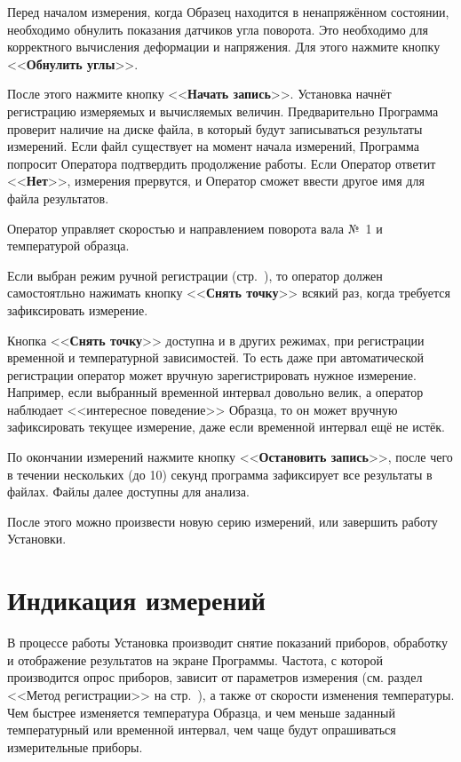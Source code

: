 \documentclass[12pt, a4paper, twocolumn]{book}
\newcommand{\CTL}[1]{<<{\bf #1}>>}
\begin{document}
Перед началом измерения, когда Образец находится в ненапряжённом состоянии, необходимо обнулить показания датчиков угла поворота. Это необходимо для корректного вычисления деформации и напряжения. Для этого нажмите кнопку \CTL{Обнулить углы}.

После этого нажмите кнопку \CTL{Начать запись}. Установка начнёт регистрацию измеряемых и вычисляемых величин. Предварительно Программа проверит наличие на диске файла, в который будут записываться результаты измерений. Если файл существует на момент начала измерений, Программа попросит Оператора подтвердить продолжение работы. Если Оператор ответит \CTL{Нет}, измерения прервутся, и Оператор сможет ввести другое имя для файла результатов.

Оператор управляет скоростью и направлением поворота вала №~1 и температурой образца.

Если выбран режим ручной регистрации (стр.~\pageref{sec_reg_type_manual}), то оператор должен самостоятльно нажимать кнопку \CTL{Снять точку}\label{sec_manual} всякий раз, когда требуется зафиксировать измерение.

Кнопка \CTL{Снять точку} доступна и в других режимах, при регистрации временной и температурной зависимостей. То есть даже при автоматической регистрации оператор может вручную зарегистрировать нужное измерение. Например, если выбранный временной интервал довольно велик, а оператор наблюдает <<интересное поведение>> Образца, то он может вручную зафиксировать текущее измерение, даже если временной интервал ещё не истёк.

По окончании измерений нажмите кнопку \CTL{Остановить запись}, после чего в течении нескольких (до 10) секунд программа зафиксирует все результаты в файлах. Файлы далее доступны для анализа.

После этого можно произвести новую серию измерений, или завершить работу Установки.

\section{Индикация измерений}

В процессе работы Установка производит снятие показаний приборов, обработку и отображение результатов на экране Программы. Частота, с которой производится опрос приборов, зависит от параметров измерения (см. раздел <<Метод регистрации>> на стр.~\pageref{sec_reg_method}), а также от скорости изменения температуры. Чем быстрее изменяется температура Образца, и чем меньше заданный температурный или временной интервал, чем чаще будут опрашиваться измерительные приборы.
\end{document}
